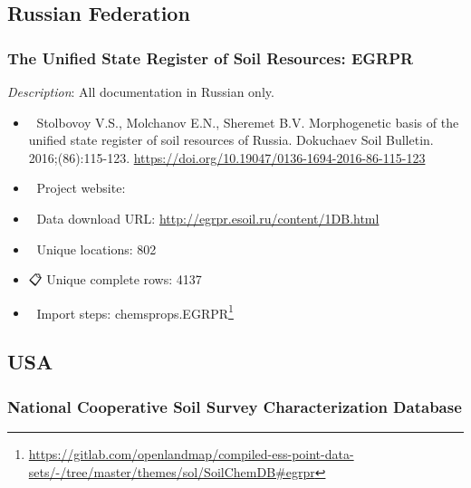 \documentclass[
  graybox,natbib,nospthms]{svmono}
\providecommand{\tightlist}{%
  \setlength{\itemsep}{0pt}\setlength{\parskip}{0pt}}
\providecommand{\tightlist}{\setlength{\itemsep}{0pt}\setlength{\parskip}{0pt}}
\renewcommand{\href}[2]{#2 (\url{#1})}
\renewcommand{\href}[2]{#2\footnote{\url{#1}}}
\begin{document}
\hypertarget{russian-federation}{%
\subsection{Russian Federation}\label{russian-federation}}

\hypertarget{the-unified-state-register-of-soil-resources-egrpr}{%
\subsubsection{The Unified State Register of Soil Resources: EGRPR}\label{the-unified-state-register-of-soil-resources-egrpr}}

\emph{Description}: All documentation in Russian only.

\begin{itemize}
\tightlist
\item
  📕 Stolbovoy V.S., Molchanov E.N., Sheremet B.V. Morphogenetic basis of the unified state register of soil resources of Russia. Dokuchaev Soil Bulletin. 2016;(86):115-123. \url{https://doi.org/10.19047/0136-1694-2016-86-115-123}\\
\item
  🔗 Project website:\\
\item
  📂 Data download URL: \url{http://egrpr.esoil.ru/content/1DB.html}\\
\item
  📍 Unique locations: 802\\
\item
  📋 Unique complete rows: 4137\\
\item
  📝 Import steps: \href{https://gitlab.com/openlandmap/compiled-ess-point-data-sets/-/tree/master/themes/sol/SoilChemDB\#egrpr}{chemsprops.EGRPR}
\end{itemize}

\hypertarget{usa}{%
\subsection{USA}\label{usa}}

\hypertarget{national-cooperative-soil-survey-characterization-database}{%
\subsubsection{National Cooperative Soil Survey Characterization Database}\label{national-cooperative-soil-survey-characterization-database}}
\end{document}
